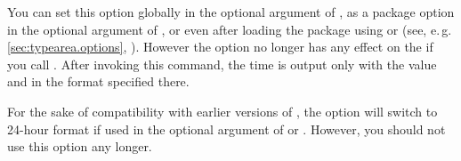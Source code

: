 You can set this option globally in the optional argument of
, as a package option in the optional
argument of , or even after loading the
package using  or
 (see, e.\,g. \autoref{sec:typearea.options},
). However the option no longer has any
effect on the if you call . After invoking this
command, the time is output only with the value and in the format specified
there.

For the sake of compatibility with earlier versions of
, the option  will switch to 24-hour format if
used in the optional argument of  or .
However, you should not use this option any longer.%
\EndIndexGroup
%
\EndIndexGroup

\endinput

